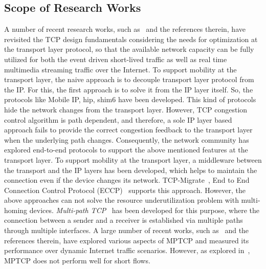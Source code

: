\subsection{Scope of Research Works}
A number of recent research works, such as~\cite{Yadav2016,abdrabou2016experimental,de2016observing,de2016throughput,islam2016start,maity2017tcp,liu2016improving} and the references therein, have revisited the TCP design fundamentals considering the needs for optimization at the transport layer protocol, so that the available network capacity can be fully utilized for both the event driven short-lived traffic as well as real time multimedia streaming traffic over the Internet. To support mobility at the transport layer, the naive approach is to decouple transport layer protocol from the IP. For this, the first approach is to solve it from the IP layer itself. So, the protocols like Mobile IP, \acrfull{hip}, \acrfull{shim6} have been developed. This kind of protocols hide the network changes from the transport layer. However, TCP congestion control algorithm is path dependent, and therefore, a sole IP layer based approach fails to provide the correct congestion feedback to the transport layer when the underlying path changes.  Consequently, the network community has explored end-to-end protocols to support the above mentioned features at the transport layer. To support mobility at the transport layer, a middleware between the transport and the IP layers has been developed, which helps to maintain the connection even if the device changes its network. TCP-Migrate~\cite{TCP-Migrate},  End to End Connection Control Protocol (ECCP)~\cite{ECCP} supports this approach.  However, the above approaches can not solve the resource underutilization problem with multi-homing devices. {\em Multi-path TCP}~\cite{scharf2013multipath} has been developed for this purpose, where the connection between a sender and a receiver is established via multiple paths through multiple interfaces. A large number of recent works, such as~\cite{oh2016feedback,barik2016lisa,OLIARamin2012} and the references therein, have explored various aspects of MPTCP and measured its performance over dynamic Internet traffic scenarios. However, as explored in~\cite{kheirkhah2016mmptcp,kheirkhah2015short}, MPTCP does not perform well for short flows. 

